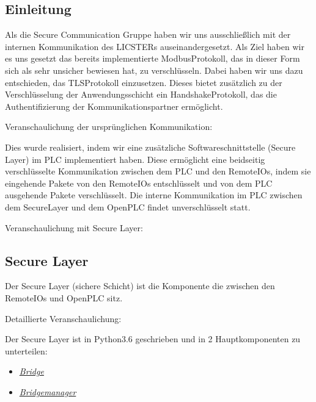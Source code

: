 \documentclass[letterpaper,10pt,ngerman]{sphinxmanual}
\begin{document}
\subsection{Einleitung}
\label{\detokenize{seccom:einleitung}}
Als die Secure Communication Gruppe haben wir uns ausschließlich mit der internen Kommunikation des LICSTERs auseinandergesetzt. Als Ziel haben wir es uns gesetzt das bereits implementierte Modbus\sphinxhyphen{}Protokoll, das in dieser Form sich als sehr unsicher bewiesen hat, zu verschlüsseln. Dabei haben wir uns dazu entschieden, das TLS\sphinxhyphen{}Protokoll einzusetzen. Dieses bietet zusätzlich zu der Verschlüsselung der Anwendungsschicht ein Handshake\sphinxhyphen{}Protokoll, das die Authentifizierung der Kommunikationspartner ermöglicht.

Veranschaulichung der ursprünglichen Kommunikation:


Dies wurde realisiert, indem wir eine zusätzliche Softwareschnittstelle (Secure Layer) im PLC implementiert haben. Diese ermöglicht eine beidseitig verschlüsselte Kommunikation zwischen dem PLC und den Remote\sphinxhyphen{}IOs, indem sie eingehende Pakete von den Remote\sphinxhyphen{}IOs entschlüsselt und von dem PLC ausgehende Pakete verschlüsselt. Die interne Kommunikation im PLC zwischen dem Secure\sphinxhyphen{}Layer und dem OpenPLC findet unverschlüsselt statt.

Veranschaulichung mit Secure Layer:



\subsection{Secure Layer}
\label{\detokenize{seccom:secure-layer}}
Der Secure Layer (sichere Schicht) ist die Komponente die zwischen den Remote\sphinxhyphen{}IOs und OpenPLC sitz.

Detaillierte Veranschaulichung:


Der Secure Layer ist in Python3.6 geschrieben und in 2 Hauptkomponenten zu unterteilen:
\begin{itemize}
\item {} 
{\hyperref[\detokenize{seccom:bridge}]{\emph{Bridge}}}

\item {} 
{\hyperref[\detokenize{seccom:bridgemanager}]{\emph{Bridgemanager}}}

\end{itemize}
\end{document}
